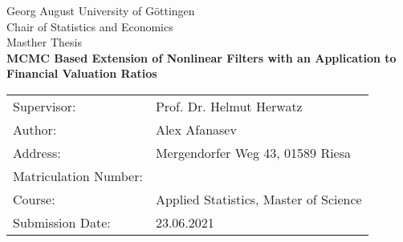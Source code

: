 \begin{titlepage}
	\begin{center}
	\vspace*{4cm}
	{\LARGE Georg August University of Göttingen}\\
	\vskip 1.5cm
	{\large Chair of Statistics and Economics}\\
	\vskip 0.5cm
	{\large Masther Thesis}\\
	\vskip 2.0cm
	{\huge\textbf{MCMC Based Extension of Nonlinear Filters with an Application to Financial Valuation Ratios}}\\
	\end{center}
\vfill
\vfill
\begin{tabular}{ll}
	Supervisor: & Prof. Dr. Helmut Herwatz \\
	Author: & Alex Afanasev \\
	Address: & Mergendorfer Weg 43, 01589 Riesa \\
	Matriculation Number: &  \\
	Course: & Applied Statistics, Master of Science \\
	Submission Date: & 23.06.2021 \\
\end{tabular}
\end{titlepage}
